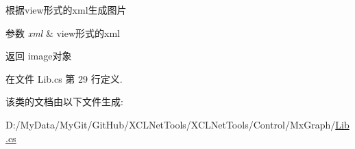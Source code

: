 根据view形式的xml生成图片 


\begin{DoxyParams}{参数}
{\em xml} & view形式的xml\\
\hline
\end{DoxyParams}
\begin{DoxyReturn}{返回}
image对象
\end{DoxyReturn}


在文件 Lib.\-cs 第 29 行定义.



该类的文档由以下文件生成\-:\begin{DoxyCompactItemize}
\item 
D\-:/\-My\-Data/\-My\-Git/\-Git\-Hub/\-X\-C\-L\-Net\-Tools/\-X\-C\-L\-Net\-Tools/\-Control/\-Mx\-Graph/\hyperlink{_control_2_mx_graph_2_lib_8cs}{Lib.\-cs}\end{DoxyCompactItemize}
